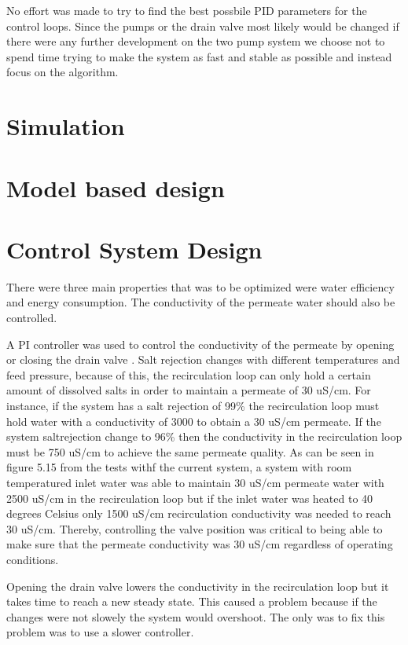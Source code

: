 No effort was made to try to find the best possbile PID parameters for the control loops. Since the pumps or the drain valve most likely would be changed if there were any further development on the two pump system we choose not to spend time trying to make the system as fast and stable as possible and instead focus on the algorithm. 

\section{Simulation}

\section{Model based design}

\section{Control System Design}

There were three main properties that was to be optimized were water efficiency and energy consumption. The conductivity of the permeate water should also be controlled.

A PI controller was used to control the conductivity of the permeate by opening or closing the drain valve . Salt rejection changes with different temperatures and feed pressure, because of this, the recirculation loop can only hold a certain amount of dissolved salts in order to maintain a permeate of 30 uS/cm. For instance, if the system has a salt rejection of 99\% the recirculation loop must hold water with a conductivity of 3000 to obtain a 30 uS/cm permeate. If the system saltrejection change to 96\% then the conductivity in the recirculation loop must be 750 uS/cm to achieve the same permeate quality. As can be seen in figure 5.15 from the tests withf the current system, a system with room temperatured inlet water was able to maintain 30 uS/cm permeate water with 2500 uS/cm in the recirculation loop but if the inlet water was heated to 40 degrees Celsius only 1500 uS/cm recirculation conductivity was needed to reach 30 uS/cm. Thereby, controlling the valve position was critical to being able to make sure that the permeate conductivity was 30 uS/cm regardless of operating conditions. 

Opening the drain valve lowers the conductivity in the recirculation loop but it takes time to reach a new steady state. This caused a problem because if the changes were not slowely the system would overshoot. The only was to fix this problem was to use a slower controller.

